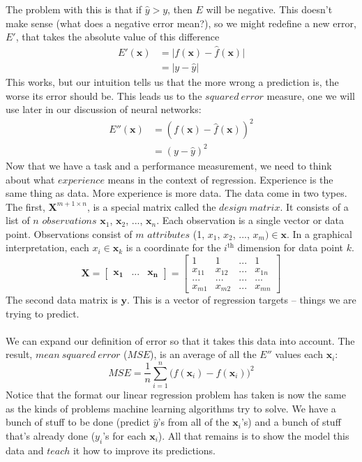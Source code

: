 \documentclass[a4paper]{article}
\begin{document}
\noindent The problem with this is that if $\hat{y} > y$, then $E$ will be negative. This doesn't make sense (what does a negative error mean?), so we might redefine a new error, $E'$, that takes the absolute value of this difference
\begin{align*}
 E'(\bm{x}) &= \vert f(\bm{x}) - \hat{f}(\bm{x})\vert \\
 &= \vert y - \hat{y} \vert
 \end{align*}
\noindent This works, but our intuition tells us that the more wrong a prediction is, the worse its error should be. This leads us to the $squared\ error$ measure, one we will use later in our discussion of neural networks:
\begin{align*}
E''(\bm{x}) &= ( f(\bm{x}) - \hat{f}(\bm{x}))^2  \\
&= ( y - \hat{y} )^2 
\end{align*}
\noindent Now that we have a task and a performance measurement, we need to think about what $experience$ means in the context of regression. Experience is the same thing as data. More experience is more data. The data come in two types. The first, $\bm{X}^{m +1 \times n}$, is a special matrix called the $design\ matrix$. It consists of a list of $n$ $observations$ $\bm{x}_1$, $\bm{x}_2$, ..., $\bm{x}_n$. Each observation is a single vector or data point. Observations consist of $m$ $attributes$ (1, $x_1$, $x_2$, ..., $x_m) \in \bm{x}$. In a graphical interpretation, each $x_i \in \bm{x}_k$ is a coordinate for the $i^{\mathrm{th}}$ dimension for data point $k$. 
\[
\bm{X} = \begin{bmatrix}
 \bm{x_1} & ... & \bm{x_n}
 \end{bmatrix}
=\begin{bmatrix}
1 & 1 &...&1 \\
x_{11} & x_{12} & ... & x_{1n} \\
...& ... &... & ...\\
x_{m1} & x_{m2}& ...& x_{mn}
\end{bmatrix}
\]
The second data matrix is $\bm{y}$. This is a vector of regression targets -- things we are trying to predict. 
\\ \\
\noindent We can expand our definition of error so that it takes this data into account. The result, $mean\ squared\ error$ ($MSE$), is an average of all the $E''$ values each $\bm{x}_i$:
\[ MSE = \frac{1}{n}\sum_{i = 1}^n \bigg( f(\bm{x}_i) - \hat{f}(\bm{x}_i)\bigg)^2 \]
\noindent Notice that the format our linear regression problem has taken is now the same as the kinds of problems machine learning algorithms try to solve. We have a bunch of stuff to be done (predict $\hat{y}$'s from all of the $\bm{x}_i$'s) and a bunch of stuff that's already done ($y_i$'s for each $\bm{x}_i$). All that remains is to show the model this data and $teach$ it how to improve its predictions.
\end{document}
